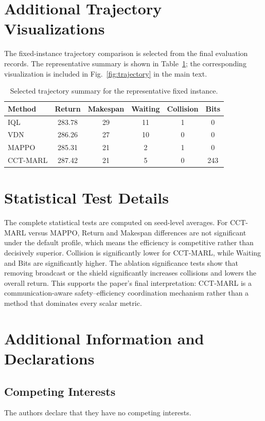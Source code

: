 \documentclass[fleqn,10pt]{wlpeerj}
\begin{document}
\section{Additional Trajectory Visualizations}
The fixed-instance trajectory comparison is selected from the final evaluation records. The representative summary is shown in Table~\ref{tab:trajectory_summary}; the corresponding visualization is included in Fig.~\ref{fig:trajectory} in the main text.

\begin{table}[htbp]
\centering
\caption{Selected trajectory summary for the representative fixed instance.}
\label{tab:trajectory_summary}
\begin{tabular}{lccccc}
\toprule
Method & Return & Makespan & Waiting & Collision & Bits \\
\midrule
IQL & 283.78 & 29 & 11 & 1 & 0 \\
VDN & 286.26 & 27 & 10 & 0 & 0 \\
MAPPO & 285.31 & 21 & 2 & 1 & 0 \\
CCT-MARL & 287.42 & 21 & 5 & 0 & 243 \\
\bottomrule
\end{tabular}
\end{table}

\section{Statistical Test Details}
The complete statistical tests are computed on seed-level averages. For CCT-MARL versus MAPPO, Return and Makespan differences are not significant under the default profile, which means the efficiency is competitive rather than decisively superior. Collision is significantly lower for CCT-MARL, while Waiting and Bits are significantly higher. The ablation significance tests show that removing broadcast or the shield significantly increases collisions and lowers the overall return. This supports the paper's final interpretation: CCT-MARL is a communication-aware safety--efficiency coordination mechanism rather than a method that dominates every scalar metric.


\section{Additional Information and Declarations}
\label{sec:declarations}

\subsection{Competing Interests}
The authors declare that they have no competing interests.
\end{document}
